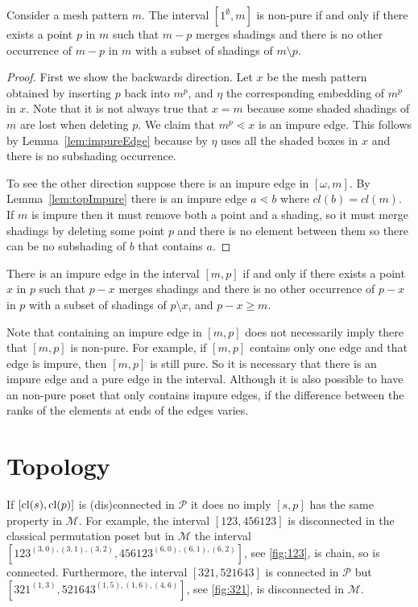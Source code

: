 \documentclass[11pt,a4paper,oneside]{article}
\begin{document}
\begin{prop}
Consider a mesh pattern $m$. The interval $[1^\emptyset,m]$ is non-pure if and
only if there exists a point $p$ in $m$ such that $m-p$ merges shadings and
there is no other occurrence of $m-p$ in $m$ with a subset of shadings of
$m\setminus p$.
\begin{proof}
First we show the backwards direction. Let $x$  be the mesh pattern obtained by
inserting $p$ back into $m^p$, and $\eta$ the corresponding embedding of $m^p$
in $x$. Note that it is not always true that $x=m$ because some shaded shadings
of $m$ are lost when deleting $p$. We claim that $m^p\lessdot x$ is an impure
edge. This follows by Lemma~\ref{lem:impureEdge} because by $\eta$ uses all the
shaded boxes in $x$ and there is no subshading occurrence.

To see the other direction suppose there is an impure edge in $[\omega,m]$. By
Lemma~\ref{lem:topImpure} there is an impure edge $a\lessdot b$ where
$cl(b)=cl(m)$. If $m$ is impure then it must remove both a point and a shading,
so it must merge shadings by deleting some point $p$ and there is no element
between them so there can be no subshading of $b$ that contains $a$.
\end{proof}
\end{prop}

\begin{cor}
There is an impure edge in the interval $[m,p]$ if and only if there exists a
point $x$ in $p$ such that $p-x$ merges shadings and there is no other
occurrence of $p-x$ in $p$ with a subset of shadings of $p\setminus x$, and
$p-x\ge m$.
\end{cor}

Note that containing an impure edge in $[m,p]$ does not necessarily imply there
that $[m,p]$ is non-pure. For example, if $[m,p]$ contains only one edge and
that edge is impure, then $[m,p]$ is still pure. So it is necessary that there
is an impure edge and a pure edge in the interval. Although it is also possible
to have an non-pure poset that only contains impure edges, if the difference
between the ranks of the elements at ends of the edges varies.


\section{Topology}

If $[\operatorname{\textrm{cl}}(s),\operatorname{\textrm{cl}}(p)]$ is (dis)connected in $\mathcal{P}$ it does no imply $[s,p]$
has the same property in $\mathcal{M}$. For example, the interval $[123,456123]$
is disconnected in the classical permutation poset but in $\mathcal{M}$ the
interval $[123^{(3,0),(3,1),(3,2)},456123^{(6,0),(6,1),(6,2)}]$, see
\cref{fig:123}, is chain, so is connected. Furthermore, the interval
$[321,521643]$ is connected in $\mathcal{P}$ but $[321^{(1, 3)},521643^{(1, 5),
(1, 6), (4, 6)}]$, see \cref{fig:321}, is disconnected in $\mathcal{M}$.
\end{document}
